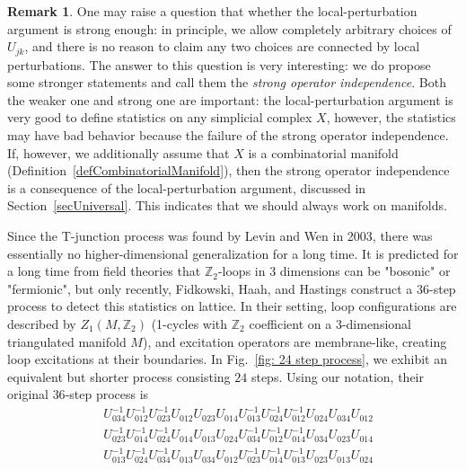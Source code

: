 \documentclass[reprint, amsmath, amssymb, showpacs, floatfix, longbibliography, aps, twocolumn, superscriptaddress, nofootinbib]{revtex4-2}
\newcommand{\ZZ}{{\mathbb Z}}
\theoremstyle{definition}
\newtheorem{remark}{Remark}[section]
\begin{document}
\begin{remark}
	One may raise a question that whether the local-perturbation argument is strong enough: in principle, we allow completely arbitrary choices of $U_{jk}$, and there is no reason to claim any two choices are connected by local perturbations. The answer to this question is very interesting: we do propose some stronger statements and call them the \textit{strong operator independence}. Both the weaker one and strong one are important: the local-perturbation argument is very good to define statistics on any simplicial complex $X$, however, the statistics may have bad behavior because the failure of the strong operator independence. If, however, we additionally assume that $X$ is a combinatorial manifold (Definition~\ref{defCombinatorialManifold}), then the strong operator independence is a consequence of the local-perturbation argument, discussed in Section~\ref{secUniversal}. This indicates that we should always work on manifolds.
\end{remark}

Since the T-junction process was found by Levin and Wen in 2003, there was essentially no higher-dimensional generalization for a long time. It is predicted for a long time from field theories that $\ZZ_2$-loops in $3$ dimensions can be "bosonic" or "fermionic", but only recently, Fidkowski, Haah, and Hastings \cite{FHH21} construct a $36$-step process to detect this statistics on lattice. In their setting, loop configurations are described by $Z_1(M,\ZZ_2)$ (1-cycles with $\ZZ_2$ coefficient on a $3$-dimensional triangulated manifold $M$), and 
excitation operators are membrane-like, creating loop excitations at their boundaries. In Fig.~\ref{fig: 24 step process}, we exhibit an equivalent but shorter process consisting $24$ steps. Using our notation, their original $36$-step process is
\begin{equation}\label{eq36Step}
	\begin{aligned}
		&U_{034}^{-1} U_{012}^{-1} U_{023}^{-1} U_{012} U_{023} U_{014} U_{013}^{-1} U_{024}^{-1} U_{012}^{-1} U_{024} U_{034} U_{012} \\
		&U_{023}^{-1} U_{014}^{-1} U_{024}^{-1} U_{014} U_{013} U_{024} U_{034}^{-1} U_{012}^{-1} U_{014}^{-1} U_{034} U_{023} U_{014} \\
		&U_{013}^{-1} U_{024}^{-1} U_{034}^{-1} U_{013} U_{034} U_{012} U_{023}^{-1} U_{014}^{-1} U_{013}^{-1} U_{023} U_{013} U_{024}
	\end{aligned}
\end{equation}
\end{document}
